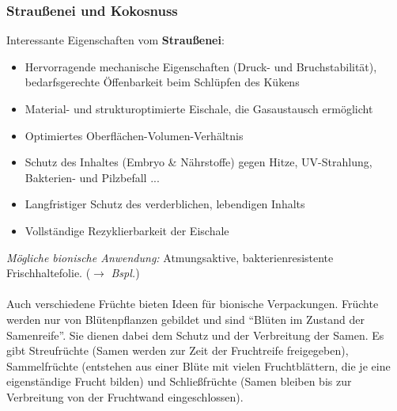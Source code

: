 \subsubsection{Straußenei und Kokosnuss}

Interessante Eigenschaften vom \textbf{Straußenei}:
\begin{itemize}
    \item Hervorragende mechanische Eigenschaften (Druck- und Bruchstabilität), bedarfsgerechte Öffenbarkeit beim Schlüpfen des Kükens
    \item Material- und strukturoptimierte Eischale, die Gasaustausch ermöglicht
    \item Optimiertes Oberflächen-Volumen-Verhältnis
    \item Schutz des Inhaltes (Embryo \& Nährstoffe) gegen Hitze, UV-Strahlung, Bakterien- und Pilzbefall ...
    \item Langfristiger Schutz des verderblichen, lebendigen Inhalts
    \item Vollständige Rezyklierbarkeit der Eischale
\end{itemize}

\textit{Mögliche bionische Anwendung:} Atmungsaktive, bakterienresistente Frischhaltefolie. (\dangersign $\rightarrow$ \textit{Bspl.})
\\\\
Auch verschiedene Früchte bieten Ideen für bionische Verpackungen. Früchte werden nur von Blütenpflanzen gebildet und sind ``Blüten im Zustand der Samenreife''. Sie dienen dabei dem Schutz und der Verbreitung der Samen. Es gibt Streufrüchte (Samen werden zur Zeit der Fruchtreife freigegeben), Sammelfrüchte (entstehen aus einer Blüte mit vielen Fruchtblättern, die je eine eigenständige Frucht bilden) und Schließfrüchte (Samen bleiben bis zur Verbreitung von der Fruchtwand eingeschlossen).

